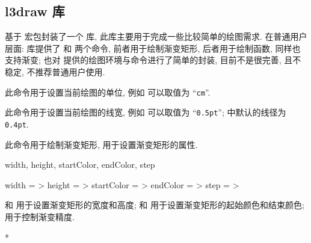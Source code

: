 \documentclass[
  hyper, lang=cn, 
  class=l3dox, 
]{../../zlatex/code/ztex}
\begin{document}
\clearpage
\subsection{l3draw 库}
\zTikZ{} 基于  宏包封装了一个  库, 此库主要用于完成一些比较简单的绘图需求. 
在普通用户层面:  库提供了  和  两个命令, 前者用于绘制渐变矩形,
后者用于绘制函数, 同样也支持渐变; \ztikz{} 也对  提供的绘图环境与命令进行了简单的封装, 
目前不是很完善, 且不稳定, 不推荐普通用户使用.


\begin{function}[added=2025-05-15]{\zdrawSetUnit}
  \begin{syntax}
  \end{syntax}
  此命令用于设置当前绘图的单位, 例如  可以取值为 ``\texttt{cm}''.
\end{function}


\begin{function}[added=2025-05-15]{\zdrawSetPathWidth}
  \begin{syntax}
  \end{syntax}
  此命令用于设置当前绘图的线宽, 例如  可以取值为 ``\texttt{0.5pt}'';
   中默认的线径为 \texttt{0.4pt}.
\end{function}


\begin{function}[added=2025-05-15]{\zrule}
  \begin{syntax}
  \end{syntax}
  此命令用于绘制渐变矩形,  用于设置渐变矩形的属性.
\end{function}

\begin{keyval}[parent=ztikz/zdraw/zrule]{width, height, startColor, endColor, step}
  \begin{syntax}
    width      = >
    height     = >
    startColor = >
    endColor   = >
    step       = >
  \end{syntax}
   和  用于设置渐变矩形的宽度和高度; 
   和  用于设置渐变矩形的起始颜色和结束颜色;
   用于控制渐变精度.
\end{keyval}
\begin{DocExample}*
\zrule[width=10, startColor=red, step=1]
\end{DocExample}
\end{document}
